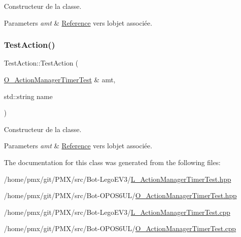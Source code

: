 Constructeur de la classe. 


\begin{DoxyParams}{Parameters}
{\em amt} & \hyperlink{structReference}{Reference} vers l\textquotesingle{}objet associée. \\
\hline
\end{DoxyParams}
\mbox{\label{classTestAction_a313c6975b35eb2ec170f843caa32bc6f}} 
\subsubsection{\texorpdfstring{Test\+Action()}{TestAction()}\hspace{0.1cm}{\footnotesize\ttfamily [2/2]}}
{\footnotesize\ttfamily Test\+Action\+::\+Test\+Action (\begin{DoxyParamCaption}\item[{\hyperlink{classO__ActionManagerTimerTest}{O\+\_\+\+Action\+Manager\+Timer\+Test} \&}]{amt,  }\item[{std\+::string}]{name }\end{DoxyParamCaption})}



Constructeur de la classe. 


\begin{DoxyParams}{Parameters}
{\em amt} & \hyperlink{structReference}{Reference} vers l\textquotesingle{}objet associée. \\
\hline
\end{DoxyParams}


The documentation for this class was generated from the following files\+:\begin{DoxyCompactItemize}
\item 
/home/pmx/git/\+P\+M\+X/src/\+Bot-\/\+Lego\+E\+V3/\hyperlink{L__ActionManagerTimerTest_8hpp}{L\+\_\+\+Action\+Manager\+Timer\+Test.\+hpp}\item 
/home/pmx/git/\+P\+M\+X/src/\+Bot-\/\+O\+P\+O\+S6\+U\+L/\hyperlink{O__ActionManagerTimerTest_8hpp}{O\+\_\+\+Action\+Manager\+Timer\+Test.\+hpp}\item 
/home/pmx/git/\+P\+M\+X/src/\+Bot-\/\+Lego\+E\+V3/\hyperlink{L__ActionManagerTimerTest_8cpp}{L\+\_\+\+Action\+Manager\+Timer\+Test.\+cpp}\item 
/home/pmx/git/\+P\+M\+X/src/\+Bot-\/\+O\+P\+O\+S6\+U\+L/\hyperlink{O__ActionManagerTimerTest_8cpp}{O\+\_\+\+Action\+Manager\+Timer\+Test.\+cpp}\end{DoxyCompactItemize}
